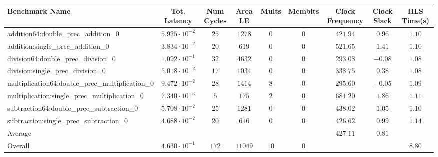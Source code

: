 \begin{tabular}{|l|c|c|c|c|c|c|c|c|}
\hline
Benchmark Name                                   & Tot. Latency            & Num Cycles & Area LE   & Mults  & Membits & Clock Frequency & Clock Slack & HLS Time(s) \\
\hline
addition64:double\_prec\_addition\_0             & $ 5.925 \cdot 10^{-2} $ & $ 25     $ & $ 1278  $ & $ 0  $ & $ 0   $ & $ 421.94      $ & $ 0.96    $ & $ 1.10    $ \\
addition:single\_prec\_addition\_0               & $ 3.834 \cdot 10^{-2} $ & $ 20     $ & $ 619   $ & $ 0  $ & $ 0   $ & $ 521.65      $ & $ 1.41    $ & $ 1.10    $ \\
division64:double\_prec\_division\_0             & $ 1.092 \cdot 10^{-1} $ & $ 32     $ & $ 4632  $ & $ 0  $ & $ 0   $ & $ 293.08      $ & $ -0.08   $ & $ 1.08    $ \\
division:single\_prec\_division\_0               & $ 5.018 \cdot 10^{-2} $ & $ 17     $ & $ 1034  $ & $ 0  $ & $ 0   $ & $ 338.75      $ & $ 0.38    $ & $ 1.08    $ \\
multiplication64:double\_prec\_multiplication\_0 & $ 9.472 \cdot 10^{-2} $ & $ 28     $ & $ 1414  $ & $ 8  $ & $ 0   $ & $ 295.60      $ & $ -0.05   $ & $ 1.09    $ \\
multiplication:single\_prec\_multiplication\_0   & $ 7.340 \cdot 10^{-3} $ & $ 5      $ & $ 175   $ & $ 2  $ & $ 0   $ & $ 681.20      $ & $ 1.86    $ & $ 1.11    $ \\
subtraction64:double\_prec\_subtraction\_0       & $ 5.708 \cdot 10^{-2} $ & $ 25     $ & $ 1281  $ & $ 0  $ & $ 0   $ & $ 438.02      $ & $ 1.05    $ & $ 1.10    $ \\
subtraction:single\_prec\_subtraction\_0         & $ 4.688 \cdot 10^{-2} $ & $ 20     $ & $ 616   $ & $ 0  $ & $ 0   $ & $ 426.62      $ & $ 0.99    $ & $ 1.14    $ \\
\hline
Average                                          & $                     $ & $        $ & $       $ & $    $ & $     $ & $ 427.11      $ & $ 0.81    $ & $         $ \\
\hline
Overall                                          & $ 4.630 \cdot 10^{-1} $ & $ 172    $ & $ 11049 $ & $ 10 $ & $ 0   $ & $             $ & $         $ & $ 8.80    $ \\
\hline
\end{tabular}

